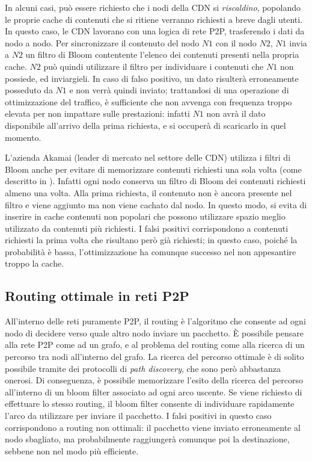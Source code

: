 In alcuni casi, può essere richiesto che i nodi della CDN si \emph{riscaldino}, popolando le
proprie cache di contenuti che si ritiene verranno richiesti a breve dagli utenti. In questo caso,
le CDN lavorano con una logica di rete P2P, trasferendo i dati da nodo a nodo. Per sincronizzare
il contenuto del nodo $N1$ con il nodo $N2$, $N1$ invia a $N2$ un filtro di Bloom contentente
l'elenco dei contenuti presenti nella propria cache. $N2$ può quindi utilizzare il filtro
per individuare i contenuti che $N1$ non possiede, ed inviargieli. In caso di falso positivo,
un dato risulterà erroneamente posseduto da $N1$ e non verrà quindi inviato; trattandosi di una
operazione di ottimizzazione del traffico, è sufficiente che non avvenga con frequenza troppo 
elevata per non impattare sulle prestazioni: infatti $N1$ non avrà il dato disponibile all'arrivo
della prima richiesta, e si occuperà di scaricarlo in quel momento. 

L'azienda Akamai (leader di mercato nel settore delle CDN) utilizza i filtri di Bloom anche per
evitare di memorizzare contenuti richiesti una sola volta (come descritto in \cite{bloom-akamai}).
Infatti ogni nodo conserva un filtro di Bloom dei contenuti richiesti almeno una volta. Alla prima
richiesta, il contenuto non è ancora presente nel filtro e viene aggiunto ma non viene cachato
dal nodo. In questo modo, si evita di inserire in cache contenuti non popolari che possono 
utilizzare spazio meglio utilizzato da contenuti più richiesti. I falsi positivi corrispondono
a contenuti richiesti la prima volta che risultano però già richiesti; in questo caso, poiché
la probabilità è bassa, l'ottimizzazione ha comunque successo nel non appesantire troppo la cache.

\subsection{Routing ottimale in reti P2P}

All'interno delle reti puramente P2P, il routing è l'algoritmo che consente ad ogni nodo di
decidere verso quale altro nodo inviare un pacchetto. È possibile pensare alla rete P2P come
ad un grafo, e al problema del routing come alla ricerca di un percorso tra nodi all'interno
del grafo. La ricerca del percorso ottimale è di solito possibile tramite dei protocolli di 
\emph{path discovery}, che sono però abbastanza onerosi. Di conseguenza, è possibile memorizzare
l'esito della ricerca del percorso all'interno di un bloom filter associato ad ogni arco uscente.
Se viene richiesto di effettuare lo stesso routing, il bloom filter consente di individuare
rapidamente l'arco da utilizzare per inviare il pacchetto. I falsi positivi in questo caso
corrispondono a routing non ottimali: il pacchetto viene inviato erroneamente al nodo sbagliato,
ma probabilmente raggiungerà comunque poi la destinazione, sebbene non nel modo più efficiente. 

